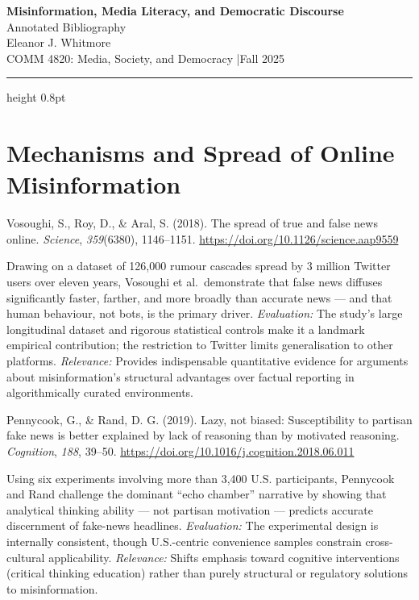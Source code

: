 \documentclass[11pt, letterpaper]{article}
\newcommand{\bibentry}[2]{%
  \begin{list}{}{%
    \setlength{\leftmargin}{0.5in}%
    \setlength{\itemindent}{-0.5in}%
    \setlength{\topsep}{6pt}%
    \setlength{\itemsep}{0pt}%
    \setlength{\parsep}{0pt}%
  }%
  \item \textcolor{neutral}{#1}%
  \end{list}%
  \vspace{4pt}%
  \begin{list}{}{%
    \setlength{\leftmargin}{0.5in}%
    \setlength{\topsep}{0pt}%
    \setlength{\itemsep}{0pt}%
    \setlength{\parsep}{0pt}%
  }%
  \item \textcolor{neutral}{#2}%
  \end{list}%
  \vspace{10pt}%
}
\newcommand{\titleblock}[3]{%
  \begin{center}
    {\LARGE\bfseries\color{accent} #1}\\[6pt]
    {\large\color{neutral} Annotated Bibliography}\\[10pt]
    {\normalsize\color{neutral} #2}\\[3pt]
    {\normalsize\color{neutral} #3}
  \end{center}%
  \vspace{4pt}%
  {\color{light}\hrule height 0.8pt}%
  \vspace{14pt}%
}
\begin{document}
\color{neutral}

\titleblock
  {Misinformation, Media Literacy, and Democratic Discourse}
  {Eleanor J. Whitmore}
  {COMM 4820: Media, Society, and Democracy \quad|\quad Fall 2025}

\section{Mechanisms and Spread of Online Misinformation}

\bibentry
  {Vosoughi, S., Roy, D., \& Aral, S. (2018). The spread of true and false news online.
   \textit{Science}, \textit{359}(6380), 1146–1151.
   \href{https://doi.org/10.1126/science.aap9559}{https://doi.org/10.1126/science.aap9559}}
  {Drawing on a dataset of 126,000 rumour cascades spread by 3 million Twitter users over eleven
   years, Vosoughi et al.\ demonstrate that false news diffuses significantly faster, farther, and
   more broadly than accurate news — and that human behaviour, not bots, is the primary driver.
   \textit{Evaluation:} The study's large longitudinal dataset and rigorous statistical controls
   make it a landmark empirical contribution; the restriction to Twitter limits generalisation to
   other platforms. \textit{Relevance:} Provides indispensable quantitative evidence for arguments
   about misinformation's structural advantages over factual reporting in algorithmically curated
   environments.}

\bibentry
  {Pennycook, G., \& Rand, D. G. (2019). Lazy, not biased: Susceptibility to partisan fake news
   is better explained by lack of reasoning than by motivated reasoning.
   \textit{Cognition}, \textit{188}, 39–50.
   \href{https://doi.org/10.1016/j.cognition.2018.06.011}{https://doi.org/10.1016/j.cognition.2018.06.011}}
  {Using six experiments involving more than 3,400 U.S. participants, Pennycook and Rand challenge
   the dominant ``echo chamber'' narrative by showing that analytical thinking ability — not
   partisan motivation — predicts accurate discernment of fake-news headlines. \textit{Evaluation:}
   The experimental design is internally consistent, though U.S.-centric convenience samples
   constrain cross-cultural applicability. \textit{Relevance:} Shifts emphasis toward cognitive
   interventions (critical thinking education) rather than purely structural or regulatory solutions
   to misinformation.}

\end{document}
